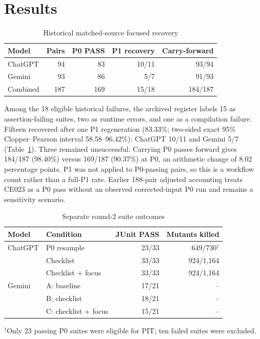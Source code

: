 \documentclass[conference]{IEEEtran}
\begin{document}
\section{Results}
\begin{table}[t]
\caption{Historical matched-source focused recovery}
\label{tab:hist}
\centering\scriptsize
\setlength{\tabcolsep}{2.5pt}
\begin{tabular}{@{}lrrrr@{}}
\toprule
Model & Pairs & P0 PASS & P1 recovery & Carry-forward \\
\midrule
ChatGPT & 94 & 83 & 10/11 & 93/94 \\
Gemini & 93 & 86 & 5/7 & 91/93 \\
\midrule
Combined & 187 & 169 & 15/18 & 184/187 \\
\bottomrule
\end{tabular}
\end{table}

Among the 18 eligible historical failures, the archived register labels 15 as assertion-failing suites, two as runtime errors, and one as a compilation failure. Fifteen recovered after one P1 regeneration (83.33\%; two-sided exact 95\% Clopper--Pearson interval 58.58--96.42\%): ChatGPT 10/11 and Gemini 5/7 (Table~\ref{tab:hist}). Three remained unsuccessful. Carrying P0 passes forward gives 184/187 (98.40\%) versus 169/187 (90.37\%) at P0, an arithmetic change of 8.02 percentage points. P1 was not applied to P0-passing pairs, so this is a workflow count rather than a full-P1 rate. Earlier 188-pair adjusted accounting treats CE023 as a P0 pass without an observed corrected-input P0 run and remains a sensitivity scenario.
\begin{table}[t]
\caption{Separate round-2 suite outcomes}
\label{tab:r2}
\centering\scriptsize
\setlength{\tabcolsep}{3pt}
\begin{tabular}{@{}llrr@{}}
\toprule
Model & Condition & JUnit PASS & Mutants killed \\
\midrule
ChatGPT & P0 resample & 23/33 & 649/730$^\dagger$ \\
 & Checklist & 33/33 & 924/1,164 \\
 & Checklist + focus & 33/33 & 924/1,164 \\
\midrule
Gemini & A: baseline & 17/21 & -- \\
 & B: checklist & 18/21 & -- \\
 & C: checklist + focus & 15/21 & -- \\
\bottomrule
\end{tabular}
\par\raggedright\scriptsize $^\dagger$Only 23 passing P0 suites were eligible for PIT; ten failed suites were excluded.
\end{table}
\end{document}
